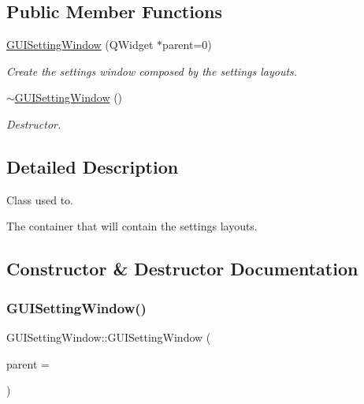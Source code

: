 \subsection*{Public Member Functions}
\begin{DoxyCompactItemize}
\item 
\mbox{\hyperlink{class_g_u_i_setting_window_a6fc8fe4f7edd2a4651f4cee7d85b29d9}{G\+U\+I\+Setting\+Window}} (Q\+Widget $\ast$parent=0)
\begin{DoxyCompactList}\small\item\em Create the settings window composed by the settings layouts. \end{DoxyCompactList}\item 
\mbox{\hyperlink{class_g_u_i_setting_window_abe96df392b79d922f4b688fe8a6cfb10}{$\sim$\+G\+U\+I\+Setting\+Window}} ()
\begin{DoxyCompactList}\small\item\em Destructor. \end{DoxyCompactList}\end{DoxyCompactItemize}


\subsection{Detailed Description}
Class used to. 

The container that will contain the settings layouts. 

\subsection{Constructor \& Destructor Documentation}
\mbox{\label{class_g_u_i_setting_window_a6fc8fe4f7edd2a4651f4cee7d85b29d9}} 
\subsubsection{\texorpdfstring{G\+U\+I\+Setting\+Window()}{GUISettingWindow()}}
{\footnotesize\ttfamily G\+U\+I\+Setting\+Window\+::\+G\+U\+I\+Setting\+Window (\begin{DoxyParamCaption}\item[{Q\+Widget $\ast$}]{parent = {} }\end{DoxyParamCaption})}



